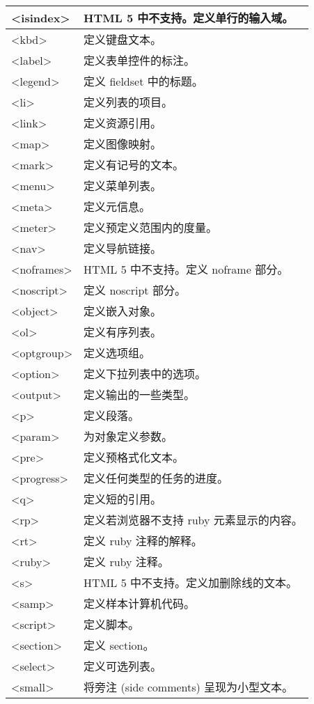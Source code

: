 \begin{longtable}{|p{80pt}|p{260pt}|}
\hline
<isindex>		&HTML 5 中不支持。定义单行的输入域。\\
\hline
<kbd>		&定义键盘文本。\\
\hline
<label>		&定义表单控件的标注。\\
\hline
<legend>		&定义 fieldset 中的标题。\\
\hline
<li>			&定义列表的项目。\\
\hline
<link>		&定义资源引用。\\
\hline
<map>		&定义图像映射。\\
\hline
<mark>		&定义有记号的文本。\\
\hline
<menu>		&定义菜单列表。\\
\hline
<meta>		&定义元信息。\\
\hline
<meter>		&定义预定义范围内的度量。\\
\hline
<nav>		&定义导航链接。\\
\hline
<noframes>	&HTML 5 中不支持。定义 noframe 部分。\\
\hline
<noscript>	&定义 noscript 部分。\\
\hline
<object>		&定义嵌入对象。\\
\hline
<ol>			&定义有序列表。\\
\hline
<optgroup>	&定义选项组。\\
\hline
<option>		&定义下拉列表中的选项。\\
\hline
<output>		&定义输出的一些类型。\\
\hline
<p>			&定义段落。\\
\hline
<param>		&为对象定义参数。\\
\hline
<pre>		&定义预格式化文本。\\
\hline
<progress>	&定义任何类型的任务的进度。\\
\hline
<q>			&定义短的引用。\\
\hline
<rp>			&定义若浏览器不支持 ruby 元素显示的内容。\\
\hline
<rt>			&定义 ruby 注释的解释。\\
\hline
<ruby>		&定义 ruby 注释。\\
\hline
<s>			&HTML 5 中不支持。定义加删除线的文本。\\
\hline
<samp>		&定义样本计算机代码。\\
\hline
<script>		&定义脚本。\\
\hline
<section>		&定义 section。\\
\hline
<select>		&定义可选列表。\\
\hline
<small>		&将旁注 (side comments) 呈现为小型文本。\\

\end{longtable}
